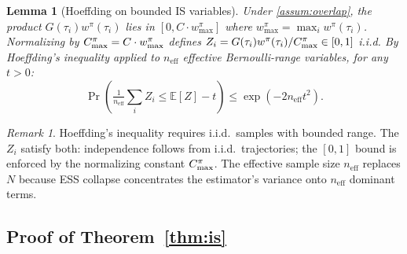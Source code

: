 \documentclass[10pt]{article}
\theoremstyle{plain}
\newtheorem{lemma}[theorem]{Lemma}
\theoremstyle{definition}
\theoremstyle{remark}
\newtheorem{remark}{Remark}
\newcommand{\E}{\mathbb{E}}
\newcommand{\neff}{n_{\mathrm{eff}}}
\begin{document}
\begin{lemma}[Hoeffding on bounded IS variables]
  \label{lem:hoeffding_is}
  Under \cref{assum:overlap}, the product $G(\tau_i)w^\pi(\tau_i)$ lies in
  $[0, C\cdot w_{\max}^\pi]$ where $w_{\max}^\pi=\max_i w^\pi(\tau_i)$.
  Normalizing by $C_{\rm max}^\pi=C\cdot w_{\max}^\pi$ defines
  $Z_i=G(\tau_i)w^\pi(\tau_i)/C_{\rm max}^\pi\in[0,1]$ i.i.d.
  By Hoeffding's inequality applied to $\neff$ effective Bernoulli-range
  variables, for any $t>0$:
  \begin{equation}
    \Pr\!\left(\tfrac{1}{\neff}\textstyle\sum_i Z_i \leq \E[Z]-t\right)
    \leq \exp\!\left(-2\neff t^2\right).
    \label{eq:hoeffding_is}
  \end{equation}
\end{lemma}

\begin{remark}
  Hoeffding's inequality requires i.i.d.\ samples with bounded range.  The
  $Z_i$ satisfy both: independence follows from i.i.d.\ trajectories; the
  $[0,1]$ bound is enforced by the normalizing constant $C_{\rm max}^\pi$.
  The effective sample size $\neff$ replaces $N$ because ESS collapse
  concentrates the estimator's variance onto $\neff$ dominant terms.
\end{remark}

\subsection{Proof of Theorem~\ref{thm:is}}
\label{app:proof_thm1}
\end{document}
